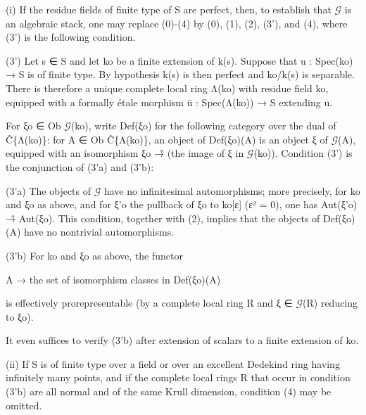 \documentclass[11pt,a4paper]{article}
\begin{document}
(i) If the residue fields of finite type of S are perfect, then, to establish that \ensuremath{\mathcal{G}} is an algebraic stack, one may replace (0)-(4) by (0), (1), (2), (3'), and (4), where (3') is the following condition.

(3') Let s ∈ S and let k\textunderscore{}o be a finite extension of k(s). Suppose that u : Spec(k\textunderscore{}o) → S is of finite type. By hypothesis k(s) is then perfect and k\textunderscore{}o/k(s) is separable. There is therefore a unique complete local ring Λ(k\textunderscore{}o) with residue field k\textunderscore{}o, equipped with a formally étale morphism ū : Spec(Λ(k\textunderscore{}o)) → S extending u.

For ξ\textunderscore{}o ∈ Ob \ensuremath{\mathcal{G}}(k\textunderscore{}o), write Def(ξ\textunderscore{}o) for the following category over the dual of Ĉ\textunderscore{}\{Λ(k\textunderscore{}o)\}: for A ∈ Ob Ĉ\textunderscore{}\{Λ(k\textunderscore{}o)\}, an object of Def(ξ\textunderscore{}o)(A) is an object ξ of \ensuremath{\mathcal{G}}(A), equipped with an isomorphism ξ\textunderscore{}o →̃ (the image of ξ in \ensuremath{\mathcal{G}}(k\textunderscore{}o)). Condition (3') is the conjunction of (3'a) and (3'b):

(3'a) The objects of \ensuremath{\mathcal{G}} have no infinitesimal automorphisms; more precisely, for k\textunderscore{}o and ξ\textunderscore{}o as above, and for ξ'\textunderscore{}o the pullback of ξ\textunderscore{}o to k\textunderscore{}o[ε] (ε² = 0), one has Aut(ξ'\textunderscore{}o) →̃ Aut(ξ\textunderscore{}o). This condition, together with (2), implies that the objects of Def(ξ\textunderscore{}o)(A) have no nontrivial automorphisms.

(3'b) For k\textunderscore{}o and ξ\textunderscore{}o as above, the functor

A → the set of isomorphism classes in Def(ξ\textunderscore{}o)(A)

is effectively prorepresentable (by a complete local ring R and ξ ∈ \ensuremath{\mathcal{G}}(R) reducing to ξ\textunderscore{}o).

It even suffices to verify (3'b) after extension of scalars to a finite extension of k\textunderscore{}o.

(ii) If S is of finite type over a field or over an excellent Dedekind ring having infinitely many points, and if the complete local rings R that occur in condition (3'b) are all normal and of the same Krull dimension, condition (4) may be omitted.
\end{document}
